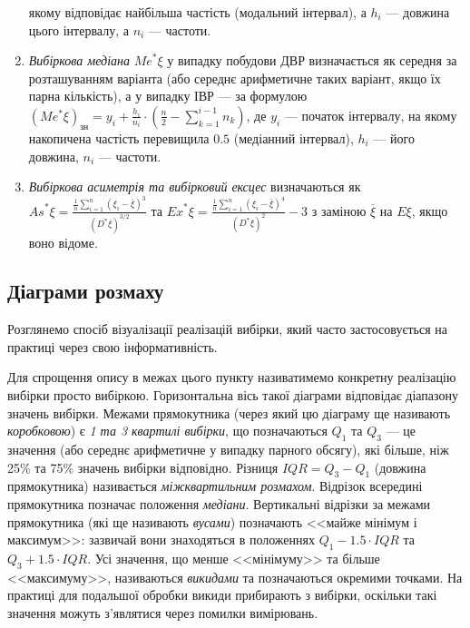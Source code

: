 \begin{enumerate}
    якому відповідає найбільша частість (модальний інтервал), а $h_i$ --- довжина цього інтервалу, а $n_i$ --- частоти.
    \item \emph{Вибіркова медіана} ${Me}^* \xi$ у випадку побудови ДВР визначається як середня за розташуванням варіанта (або середнє арифметичне 
    таких варіант, якщо їх парна кількість), а у випадку ІВР --- за формулою 
    $(Me^* \xi)_{\text{зн}} = y_i + \frac{h_i}{n_i} \cdot \left(\frac{n}{2} - \sum\limits_{k=1}^{i-1} n_k \right)$, де 
    $y_i$ --- початок інтервалу, на якому накопичена частість перевищила $0.5$ (медіанний інтервал), $h_i$ --- його довжина,
    $n_i$ --- частоти.
    \item \emph{Вибіркова асиметрія та вибірковий ексцес} визначаються як 
    ${As}^* \xi = \frac{\frac{1}{n}\sum\limits_{i=1}^n \left(\xi_i - \overline{\xi} \right)^3}{(D^*\xi)^{3/2}}$ та
    ${Ex}^* \xi = \frac{\frac{1}{n}\sum\limits_{i=1}^n \left(\xi_i - \overline{\xi} \right)^4}{(D^*\xi)^{2}} - 3$ з заміною
    $\overline{\xi}$ на $E\xi$, якщо воно відоме.
\end{enumerate}

\subsection{Діаграми розмаху}
Розглянемо спосіб візуалізації реалізацій вибірки, який часто застосовується на практиці через свою інформативність.
\begin{center}
\end{center}
Для спрощення опису в межах цього пункту називатимемо конкретну реалізацію вибірки просто вибіркою.
Горизонтальна вісь такої діаграми відповідає діапазону значень вибірки. Межами прямокутника (через який цю діаграму ще називають
\emph{коробковою}) є \emph{1 та 3 квартилі вибірки}, що позначаються $Q_1$ та $Q_3$ --- це значення (або середнє арифметичне у випадку парного обсягу), які більше, ніж 25\% та 75\% значень вибірки відповідно.
Різниця ${IQR} = Q_3 - Q_1$ (довжина прямокутника) називається \emph{міжквартильним розмахом}. Відрізок всередині прямокутника позначає положення \emph{медіани}.
Вертикальні відрізки за межами прямокутника (які ще називають \emph{вусами}) позначають <<майже мінімум і максимум>>: зазвичай вони знаходяться
в положеннях $Q_1 - 1.5\cdot{IQR}$ та $Q_3 + 1.5\cdot{IQR}$. Усі значення, що менше <<мінімуму>> та більше <<максимуму>>, називаються \emph{викидами} та 
позначаються окремими точками. На практиці для подальшої обробки викиди прибирають з вибірки, оскільки такі значення можуть з'являтися через помилки вимірювань.

